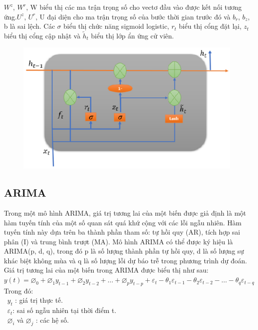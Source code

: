 \documentclass[conference]{IEEEtran}
\begin{document}
\(W^z\), \(W^r\), W biểu thị các ma trận trọng số cho vectơ đầu vào được kết nối tương ứng.\(U^z\), \(U^r\), U đại diện cho ma trận trọng số của bước thời gian trước đó và $b_r$, $b_z$, b là sai lệch. Các $\sigma$ biểu thị chức năng sigmoid logistic, $r_t$ biểu thị cổng đặt lại, $z_t$ biểu thị cổng cập nhật và $\tilde{h}_t$ biểu thị lớp ẩn ứng cử viên.
\begin{figure}[H]
    \centering
    \begin{minipage}{0.5\textwidth}
    \centering
    \includegraphics[width=1\textwidth]{Image/GRU.png}
    \label{fig:1}
    \end{minipage}
\end{figure}
\subsection{ARIMA}
Trong một mô hình ARIMA, giá trị tương lai của một biến được giả định là một hàm tuyến tính của một số quan sát quá khứ cộng với các lỗi ngẫu nhiên. Hàm tuyến tính này dựa trên ba thành phần tham số: tự hồi quy (AR), tích hợp sai phân (I) và trung bình trượt (MA). Mô hình ARIMA có thể được ký hiệu là ARIMA(p, d, q), trong đó p là số lượng thành phần tự hồi quy, d là số lượng sự khác biệt không mùa và q là số lượng lỗi dự báo trễ trong phương trình dự đoán. Giá trị tương lai của một biến trong ARIMA được biểu thị như sau:\\

\( y(t) = \varnothing_0 + \varnothing_1 y_{t-1} + \varnothing_2 y_{t-2} + \ldots + \varnothing_p y_{t-p} + \varepsilon_t - \theta_1 \varepsilon_{t-1} - \theta_2 \varepsilon_{t-2} - \ldots - \theta_q \varepsilon_{t-q} \) \\

Trong đó:\\
	\indent\textbullet\ \(y_t\) : giá trị thực tế.\\
	\indent\textbullet\ $\varepsilon_t$: sai số ngẫu nhiên tại thời điểm t.\\
        \indent\textbullet\ $\varnothing_i$ và $\varnothing_j$ : các hệ số.\\
\end{document}

